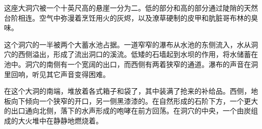\documentclass[letterpaper,twocolumn,openany,nodeprecatedcode]{dndbook}
\begin{document}
\begin{DndReadAloud}
  \begin{chinese}
    这座大洞穴被一个十英尺高的悬崖一分为二。低的部分和高的部分通过陡陗的天然台阶相连。空气中弥漫着烹饪用火的灰烬，以及潦草硬制的皮甲和肮脏哥布林的臭味。
  \end{chinese}
\end{DndReadAloud}

\begin{DndReadAloud}
  \begin{chinese}
    这个洞穴的一半被两个大蓄水池占据。一道窄窄的瀑布从水池的东侧流入，水从洞穴的西侧溢出，形成了流出洞口的溪流。低矮的石墙起到水坝的作用，将水储蓄在池中。洞穴的南侧有一个宽阔的出口，而西侧有两着狭窄的通道。瀑布的声音在洞里回响，听见其它声音变得困难。
  \end{chinese}
\end{DndReadAloud}

\begin{DndReadAloud}
  \begin{chinese}
    在这个大洞的南端，堆放着各式箱子和袋了，其中装满了抢来的补给品。西侧，地板向下倾向一个狭窄的开口，另一侧黑漆漆的。在自然形成的石阶下方，一个更大的出口通向北侧，落下的水声形成的咆哮在前方回荡。在洞穴的中央，一个由炭组成的大火堆中在静静地燃烧着。
  \end{chinese}
\end{DndReadAloud}
\end{document}

